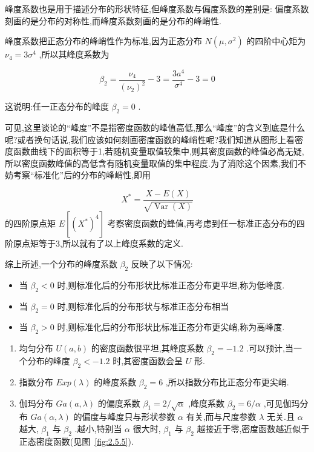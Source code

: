 峰度系数也是用于描述分布的形状特征,但峰度系数与偏度系数的差别是:
偏度系数刻画的是分布的对称性,而峰度系数刻画的是分布的峰峭性.

峰度系数把正态分布的峰峭性作为标准,因为正态分布 $ N\left(\mu, \sigma^{2}\right) $ 的四阶中心矩为 $ \nu_{4}=3 \sigma^{4} $ ,所以其峰度系数为

\[
\beta_{2}=\frac{\nu_{4}}{\left(\nu_{2}\right)^{2}}-3=\frac{3 a^{4}}{\sigma^{4}}-3=0
\]

这说明:任一正态分布的峰度 $ \beta_{2}=0 $ .

可见,这里谈论的“峰度”不是指密度函数的峰值高低,那么“峰度”的含义到底是什么呢?或者换句话说,我们应该如何刻画密度函数的峰峭性呢?我们知道从图形上看密度函数曲线下的面积等于1,若随机变量取值较集中,则其密度函数的峰值必高无疑,所以密度函数峰值的高低含有随机变量取值的集中程度.为了消除这个因素,我们不妨考察“标准化”后的分布的峰峭性,即用

\[
X^{*}=\frac{X-E(X)}{\sqrt{\operatorname{Var}(X)}}
\]
的四阶原点矩 $ E\left[\left(X^{*}\right)^{4}\right] $ 考察密度函数的蜂值,再考虑到任一标准正态分布的四阶原点矩等于3,所以就有了以上峰度系数的定义.

综上所述,一个分布的峰度系数 $ \beta_{2} $ 反映了以下情况:

\begin{itemize}
	\item 当 $ \beta_{2}<0 $ 时,则标准化后的分布形状比标准正态分布更平坦,称为低峰度.
	\item 当 $ \beta_{2}=0 $ 时,则标准化后的分布形状与标准正态分布相当
	\item 当 $ \beta_{2}>0 $ 时,则标准化后的分布形状比标准正态分布更尖峭,称为高峰度.
\end{itemize}

\begin{example}\label{exam:2.75}
	\begin{enumerate}
		\item 均匀分布 $ U(a,b) $ 的密度函数很平坦,其峰度系数 $ \beta_{2}= -1.2 $ .可以预计,当一个分布的峰度 $ \beta_{2}<-1.2 $ 时,其密度函数会呈 $ U $ 形.
		\item 指数分布 $ E x p(\lambda) $ 的峰度系数 $ \beta_{2}=6 $ ,所以指数分布比正态分布更尖峭.
		\item 伽玛分布 $ G a(a, \lambda) $ 的偏度系数 $ \beta_{1}=2 / \sqrt{\alpha} $ ,峰度系数 $ \beta_{2}=6 / \alpha $ ,可见伽玛分布 $ G a(\alpha, \lambda) $ 的偏度与峰度只与形状参数 $ \alpha $ 有关,而与尺度参数 $ \lambda $ 无关.且 $ \alpha $ 越大, $ \beta_{1} $ 与 $ \beta_{2} $ .越小,特别当 $ \alpha $ 很大时, $ \beta_{1} $ 与 $ \beta_{2} $ 越接近于零,密度函数越近似于正态密度函数(见图~\ref{fig:2.5.5}).
	\end{enumerate}
\end{example}

